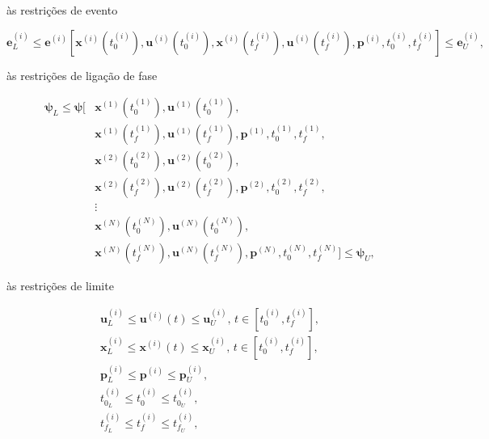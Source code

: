 \noindent às restrições de evento

\begin{equation}
\label{eq:restrições-evento}
     \mathbf{e}_L^{(i)} \leq \mathbf{e}^{(i)} \left[ 
     \mathbf{x}^{(i)} \left( t_0^{(i)} \right),
     \mathbf{u}^{(i)} \left( t_0^{(i)} \right),
     \mathbf{x}^{(i)} \left( t_f^{(i)} \right),
     \mathbf{u}^{(i)} \left( t_f^{(i)} \right),
     \mathbf{p}^{(i)}, 
     t_0^{(i)},
     t_f^{(i)} \right] \leq \mathbf{e}_U^{(i)},
\end{equation}

\noindent às restrições de ligação de fase

\begin{equation}
\label{eq:restrições-fase}
\begin{aligned}
    \boldsymbol{\psi}_L \leq \boldsymbol{\psi} [ & \mathbf{x}^{(1)} \left( t_0^{(1)} \right), \mathbf{u}^{(1)} \left( t_0^{(1)} \right), \\
        & \mathbf{x}^{(1)} \left( t_f^{(1)} \right), \mathbf{u}^{(1)} \left( t_f^{(1)} \right), \mathbf{p}^{(1)}, t_0^{(1)}, t_f^{(1)}, \\
        & \mathbf{x}^{(2)} \left( t_0^{(2)} \right), \mathbf{u}^{(2)} \left( t_0^{(2)} \right), \\
        & \mathbf{x}^{(2)} \left( t_f^{(2)} \right), \mathbf{u}^{(2)} \left( t_f^{(2)} \right), \mathbf{p}^{(2)}, t_0^{(2)}, t_f^{(2)}, \\
        & \vdots \\
        & \mathbf{x}^{(N)} \left( t_0^{(N)} \right), \mathbf{u}^{(N)} \left( t_0^{(N)} \right), \\
        & \mathbf{x}^{(N)} \left( t_f^{(N)} \right), \mathbf{u}^{(N)} \left( t_f^{(N)} \right), \mathbf{p}^{(N)}, t_0^{(N)}, t_f^{(N)} ] \leq \boldsymbol{\psi}_U ,
\end{aligned}
\end{equation}

\noindent às restrições de limite

\begin{gather}
    \mathbf{u}_L^{(i)} \leq \mathbf{u}^{(i)}(t) \leq \mathbf{u}_U^{(i)}, \, t \in \left[ t_0^{(i)}, t_f^{(i)} \right], \nonumber \\
    \mathbf{x}_L^{(i)} \leq \mathbf{x}^{(i)}(t) \leq \mathbf{x}_U^{(i)}, \, t \in \left[ t_0^{(i)}, t_f^{(i)} \right], \nonumber \\
    \mathbf{p}_L^{(i)} \leq \mathbf{p}^{(i)} \leq \mathbf{p}_U^{(i)}, \\
    t_{0_L}^{(i)} \leq t_0^{(i)} \leq t_{0_U}^{(i)}, \nonumber \\
    t_{f_L}^{(i)} \leq t_f^{(i)} \leq t_{f_U}^{(i)}, \nonumber
\end{gather}

